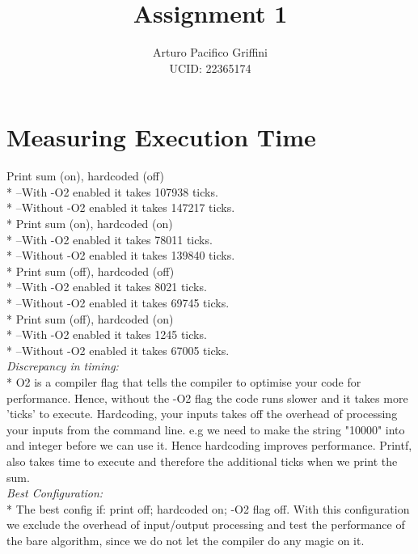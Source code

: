 \documentclass[11pt,letter]{article}
\title{Assignment 1 }
\author{Arturo Pacifico Griffini\\
	UCID: 22365174}
\date{}
\begin{document}
%

\pagebreak

\section{Measuring Execution Time}

Print sum (on), hardcoded (off)\\*
--With -O2 enabled it takes 107938 ticks.\\*
--Without -O2 enabled it takes 147217 ticks.\\*
Print sum (on), hardcoded (on)\\*
--With -O2 enabled it takes 78011 ticks.\\*
--Without -O2 enabled it takes 139840 ticks.\\*
Print sum (off), hardcoded (off)\\*
--With -O2 enabled it takes 8021 ticks.\\*
--Without -O2 enabled it takes 69745 ticks.\\*
Print sum (off), hardcoded (on)\\*
--With -O2 enabled it takes 1245 ticks.\\*
--Without -O2 enabled it takes 67005 ticks.\\[10pt]

\noindent\emph{Discrepancy in timing:}\\*
O2 is a compiler flag that tells the compiler to optimise your code for performance. Hence, without the -O2 flag the code runs slower and it takes more 'ticks' to execute. Hardcoding, your inputs takes off the overhead of processing your inputs from the command line. e.g we need to make the string "10000" into and integer before we can use it. Hence hardcoding improves performance. Printf, also takes time to execute and therefore the additional ticks when we print the sum.\\[10pt]

\noindent\emph{Best Configuration:}\\*
The best config if: print off; hardcoded on; -O2 flag off. With this configuration we exclude the overhead of input/output processing and test the performance of the bare algorithm, since we do not let the compiler do any magic on it.\\[10pt]
\end{document}
